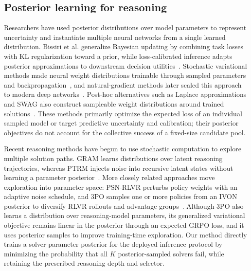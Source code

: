 \subsection{Posterior learning for reasoning}
\label{sec:related-posterior}

Researchers have used posterior distributions over model parameters to represent uncertainty and instantiate multiple neural networks from a single learned distribution.
Bissiri et al. generalize Bayesian updating by combining task losses with KL regularization toward a prior, while loss-calibrated inference adapts posterior approximations to downstream decision utilities~\citep{bissiri2016general,lacostejulien2011losscalibrated,cobb2018losscalibrated}.
Stochastic variational methods made neural weight distributions trainable through sampled parameters and backpropagation~\citep{graves2011practical,blundell2015weight}, and natural-gradient methods later scaled this approach to modern deep networks~\citep{osawa2019practical,shen2024variational}.
Post-hoc alternatives such as Laplace approximations and SWAG also construct sampleable weight distributions around trained solutions~\citep{daxberger2021laplace,maddox2019swag}.
These methods primarily optimize the expected loss of an individual sampled model or target predictive uncertainty and calibration; their posterior objectives do not account for the collective success of a fixed-size candidate pool.

Recent reasoning methods have begun to use stochastic computation to explore multiple solution paths.
GRAM learns distributions over latent reasoning trajectories, whereas PTRM injects noise into recursive latent states without learning a parameter posterior~\citep{baek2026generative,sghaier2026probabilistic}.
More closely related approaches move exploration into parameter space: PSN-RLVR perturbs policy weights with an adaptive noise schedule, and 3PO samples one or more policies from an IVON posterior to diversify RLVR rollouts and advantage groups~\citep{bai2026parameterspacenoise,venkatkrishna2026parameter}.
Although 3PO also learns a distribution over reasoning-model parameters, its generalized variational objective remains linear in the posterior through an expected GRPO loss, and it uses posterior samples to improve training-time exploration.
Our method directly trains a solver-parameter posterior for the deployed inference protocol by minimizing the probability that all $K$ posterior-sampled solvers fail, while retaining the prescribed reasoning depth and selector.

